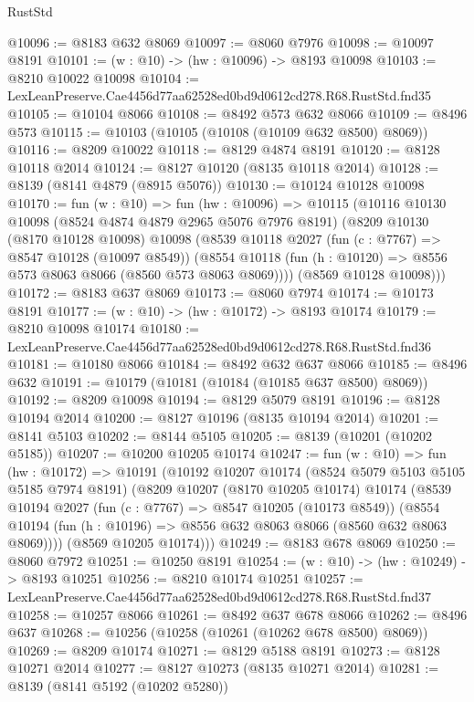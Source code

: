 \begin{lexlean}{RustStd}
\begin{coremodule}
@10096 := @8183 @632 @8069
@10097 := @8060 @7976
@10098 := @10097 @8191
@10101 := (w : @10) -> (hw : @10096) -> @8193 @10098
@10103 := @8210 @10022 @10098
@10104 := LexLeanPreserve.Cae4456d77aa62528ed0bd9d0612cd278.R68.RustStd.fnd35
@10105 := @10104 @8066
@10108 := @8492 @573 @632 @8066
@10109 := @8496 @573
@10115 := @10103 (@10105 (@10108 (@10109 @632 @8500) @8069))
@10116 := @8209 @10022
@10118 := @8129 @4874 @8191
@10120 := @8128 @10118 @2014
@10124 := @8127 @10120 (@8135 @10118 @2014)
@10128 := @8139 (@8141 @4879 (@8915 @5076))
@10130 := @10124 @10128 @10098
@10170 := fun (w : @10) =>
  fun (hw : @10096) =>
  @10115
    (@10116
      @10130
      @10098
      (@8524 @4874 @4879 @2965 @5076 @7976 @8191)
      (@8209
        @10130
        (@8170 @10128 @10098)
        @10098
        (@8539
          @10118
          @2027
          (fun (c : @7767) => @8547 @10128 (@10097 @8549))
          (@8554 @10118 (fun (h : @10120) => @8556 @573 @8063 @8066 (@8560 @573 @8063 @8069))))
        (@8569 @10128 @10098)))
@10172 := @8183 @637 @8069
@10173 := @8060 @7974
@10174 := @10173 @8191
@10177 := (w : @10) -> (hw : @10172) -> @8193 @10174
@10179 := @8210 @10098 @10174
@10180 := LexLeanPreserve.Cae4456d77aa62528ed0bd9d0612cd278.R68.RustStd.fnd36
@10181 := @10180 @8066
@10184 := @8492 @632 @637 @8066
@10185 := @8496 @632
@10191 := @10179 (@10181 (@10184 (@10185 @637 @8500) @8069))
@10192 := @8209 @10098
@10194 := @8129 @5079 @8191
@10196 := @8128 @10194 @2014
@10200 := @8127 @10196 (@8135 @10194 @2014)
@10201 := @8141 @5103
@10202 := @8144 @5105
@10205 := @8139 (@10201 (@10202 @5185))
@10207 := @10200 @10205 @10174
@10247 := fun (w : @10) =>
  fun (hw : @10172) =>
  @10191
    (@10192
      @10207
      @10174
      (@8524 @5079 @5103 @5105 @5185 @7974 @8191)
      (@8209
        @10207
        (@8170 @10205 @10174)
        @10174
        (@8539
          @10194
          @2027
          (fun (c : @7767) => @8547 @10205 (@10173 @8549))
          (@8554 @10194 (fun (h : @10196) => @8556 @632 @8063 @8066 (@8560 @632 @8063 @8069))))
        (@8569 @10205 @10174)))
@10249 := @8183 @678 @8069
@10250 := @8060 @7972
@10251 := @10250 @8191
@10254 := (w : @10) -> (hw : @10249) -> @8193 @10251
@10256 := @8210 @10174 @10251
@10257 := LexLeanPreserve.Cae4456d77aa62528ed0bd9d0612cd278.R68.RustStd.fnd37
@10258 := @10257 @8066
@10261 := @8492 @637 @678 @8066
@10262 := @8496 @637
@10268 := @10256 (@10258 (@10261 (@10262 @678 @8500) @8069))
@10269 := @8209 @10174
@10271 := @8129 @5188 @8191
@10273 := @8128 @10271 @2014
@10277 := @8127 @10273 (@8135 @10271 @2014)
@10281 := @8139 (@8141 @5192 (@10202 @5280))

\end{coremodule}
\end{lexlean}
